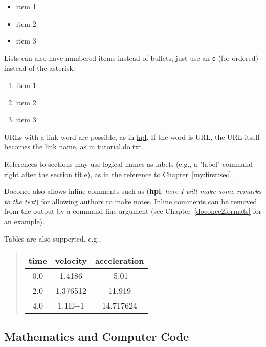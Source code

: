 \documentclass{article}
\newcommand{\inlinecomment}[2]{  ({\bf #1}: \emph{#2})  }
\begin{document}
\begin{itemize}
  \item item 1

  \item item 2

  \item item 3
\end{itemize}

\noindent
Lists can also have numbered items instead of bullets, just use an {\fontsize{10pt}{10pt}\verb!o!}
(for ordered) instead of the asterisk:

\begin{enumerate}
 \item item 1

 \item item 2

 \item item 3
\end{enumerate}

\noindent
URLs with a link word are possible, as in \href{http://folk.uio.no/hpl}{hpl}.
If the word is URL, the URL itself becomes the link name,
as in \href{tutorial.do.txt}{tutorial.do.txt}.

References to sections may use logical names as labels (e.g., a
"label" command right after the section title), as in the reference to
Chapter~\ref{my:first:sec}. 

Doconce also allows inline comments such as \inlinecomment{hpl}{here I will make
some remarks to the text} for allowing authors to make notes. Inline
comments can be removed from the output by a command-line argument
(see Chapter~\ref{doconce2formats} for an example).

Tables are also supperted, e.g.,


\begin{quote}\begin{tabular}{ccc}
\hline
\multicolumn{1}{c}{time} & \multicolumn{1}{c}{velocity} & \multicolumn{1}{c}{acceleration} \\
\hline
0.0          & 1.4186       & -5.01        \\
2.0          & 1.376512     & 11.919       \\
4.0          & 1.1E+1       & 14.717624    \\
\hline
\end{tabular}\end{quote}

\noindent

\subsection{Mathematics and Computer Code}
\end{document}
